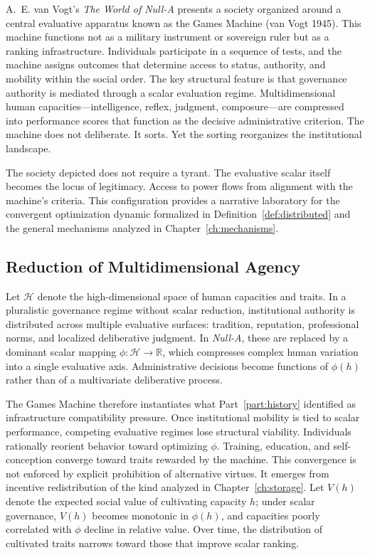 \documentclass[12pt, oneside]{book}
\theoremstyle{plain}
\theoremstyle{definition}
\theoremstyle{remark}
\theoremstyle{definition}
\begin{document}
A.~E. van Vogt's \textit{The World of Null-A} presents a society organized around a
central evaluative apparatus known as the Games Machine (van Vogt 1945). This
machine functions not as a military instrument or sovereign ruler but as a ranking
infrastructure. Individuals participate in a sequence of tests, and the machine
assigns outcomes that determine access to status, authority, and mobility within the
social order. The key structural feature is that governance authority is mediated
through a scalar evaluation regime. Multidimensional human capacities---intelligence,
reflex, judgment, composure---are compressed into performance scores that function
as the decisive administrative criterion. The machine does not deliberate. It sorts.
Yet the sorting reorganizes the institutional landscape.

The society depicted does not require a tyrant. The evaluative scalar itself becomes
the locus of legitimacy. Access to power flows from alignment with the machine's
criteria. This configuration provides a narrative laboratory for the convergent
optimization dynamic formalized in Definition~\ref{def:distributed} and the general
mechanisms analyzed in Chapter~\ref{ch:mechanisms}.

\subsection{Reduction of Multidimensional Agency}

Let $\mathcal{H}$ denote the high-dimensional space of human capacities and traits.
In a pluralistic governance regime without scalar reduction, institutional authority
is distributed across multiple evaluative surfaces: tradition, reputation, professional
norms, and localized deliberative judgment. In \textit{Null-A}, these are replaced
by a dominant scalar mapping $\phi : \mathcal{H} \to \mathbb{R}$, which compresses
complex human variation into a single evaluative axis. Administrative decisions become
functions of $\phi(h)$ rather than of a multivariate deliberative process.

The Games Machine therefore instantiates what Part~\ref{part:history} identified as
infrastructure compatibility pressure. Once institutional mobility is tied to scalar
performance, competing evaluative regimes lose structural viability. Individuals
rationally reorient behavior toward optimizing $\phi$. Training, education, and
self-conception converge toward traits rewarded by the machine. This convergence is
not enforced by explicit prohibition of alternative virtues. It emerges from incentive
redistribution of the kind analyzed in Chapter~\ref{ch:storage}. Let $V(h)$ denote
the expected social value of cultivating capacity $h$; under scalar governance,
$V(h)$ becomes monotonic in $\phi(h)$, and capacities poorly correlated with $\phi$
decline in relative value. Over time, the distribution of cultivated traits narrows
toward those that improve scalar ranking.
\end{document}
